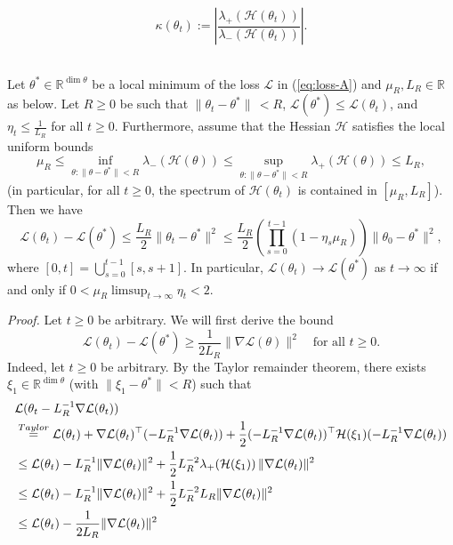 \documentclass{article}
\begin{document}
\begin{equation}
\kappa(\theta_t):=\left|\frac{\lambda_+(\mathcal{H}(\theta_t))}{\lambda_-(\mathcal{H}(\theta_t))}\right|.
\end{equation}
\bigskip
\\
\begin{proposition}\label{thm:convergence}
Let $\theta^*\in\mathbb{R}^{\dim\theta}$ be a local minimum of the loss $\mathcal{L}$ in (\ref{eq:loss-A}) and $\mu_R,L_R\in\mathbb{R}$ as below. Let $R\geq0$ be such that $\|\theta_t-\theta^*\|\,< R$, $\mathcal{L}(\theta^*)\leq\mathcal{L}(\theta_t)$, and $\eta_t\leq\frac{1}{L_R}$ for all $t\geq0$. Furthermore, assume that the Hessian $\mathcal{H}$ satisfies the local uniform bounds
\begin{equation*}
\mu_R\leq\inf_{\theta:\|\theta-\theta^*\|< R}\lambda_-(\mathcal{H}(\theta))\leq\sup_{\theta:\|\theta-\theta^*\|< R}\lambda_+(\mathcal{H}(\theta))\leq L_R,
\end{equation*}
(in particular, for all $t\geq0$, the spectrum of $\mathcal{H}(\theta_t)$ is contained in $[\mu_R,L_R]$). Then we have
\begin{equation*}
\mathcal{L}(\theta_t)-\mathcal{L}(\theta^*)\leq \frac{L_R}{2}\|\theta_t-\theta^*\|^2\leq\frac{L_R}{2}\left(\prod_{s=0}^{t-1}(1-\eta_s\mu_R)\right)\|\theta_0-\theta^*\|^2,
\end{equation*}
where $[0,t]=\bigcup_{s=0}^{t-1}[s,s+1]$. In particular, $\mathcal{L}(\theta_t)\to\mathcal{L}(\theta^*)$ as $t\to\infty$ if and only if $0<\mu_R\limsup_{t\to\infty}\eta_t<2$.
\end{proposition}
\bigskip
\noindent
\emph{Proof.} Let $t\geq0$ be arbitrary. We will first derive the bound
\begin{equation}
\mathcal{L}(\theta_t)-\mathcal{L}(\theta^*)\geq\frac{1}{2L_R}\|\nabla\mathcal{L}(\theta)\|^2\quad\text{for all $t\geq0$.}\label{eq:GD-lemma1}
\end{equation}
Indeed, let $t\geq0$ be arbitrary. By the Taylor remainder theorem, there exists $\xi_1\in\mathbb{R}^{\dim\theta}$ (with $\|\xi_1-\theta^*\|< R$) such that
\begin{align}
&\mathcal{L}(\theta_t-L_R^{-1}\nabla\mathcal{L}(\theta_t)) \notag
\\ &\stackrel{Taylor}{=} \mathcal{L}(\theta_t)+\nabla\mathcal{L}(\theta_t)^\top(-L_R^{-1}\nabla\mathcal{L}(\theta_t))+\frac{1}{2}(-L_R^{-1}\nabla\mathcal{L}(\theta_t))^\top\mathcal{H}(\xi_1)(-L_R^{-1}\nabla\mathcal{L}(\theta_t)) \notag
\\ &\leq \mathcal{L}(\theta_t)-L_R^{-1}\|\nabla\mathcal{L}(\theta_t)\|^2+\frac{1}{2}L_R^{-2}\lambda_+(\mathcal{H}(\xi_1))\,\|\nabla\mathcal{L}(\theta_t)\|^2 \notag
\\ &\leq \mathcal{L}(\theta_t)-L_R^{-1}\|\nabla\mathcal{L}(\theta_t)\|^2+\frac{1}{2}L_R^{-2}L_R\|\nabla\mathcal{L}(\theta_t)\|^2 \label{eq:L-smooth}
\\ &\leq \mathcal{L}(\theta_t)-\frac{1}{2L_R}\|\nabla\mathcal{L}(\theta_t)\|^2 \notag
\end{align}
\end{document}
